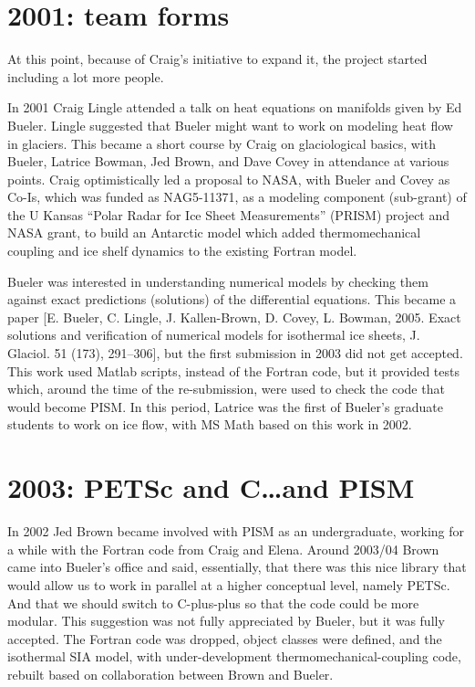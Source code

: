 \documentclass[11pt]{article}
\begin{document}
\section*{2001: team forms}

At this point, because of Craig's initiative to expand it, the project started including a lot more people.

In 2001 Craig Lingle attended a talk on heat equations on manifolds given by Ed Bueler. Lingle suggested that Bueler might want to work on modeling heat flow in glaciers. This became a short course by Craig on glaciological basics, with Bueler, Latrice Bowman, Jed Brown, and Dave Covey in attendance at various points. Craig optimistically led a proposal to NASA, with Bueler and Covey as Co-Is, which was funded as NAG5-11371, as a modeling component (sub-grant) of the U Kansas “Polar Radar for Ice Sheet Measurements” (PRISM) project and NASA grant, to build an Antarctic model which added thermomechanical coupling and ice shelf dynamics to the existing Fortran model.

Bueler was interested in understanding numerical models by checking them against exact predictions (solutions) of the differential equations. This became a paper [E. Bueler, C. Lingle, J. Kallen-Brown, D. Covey, L. Bowman, 2005. Exact solutions and verification of numerical models for isothermal ice sheets, J. Glaciol. 51 (173), 291–306], but the first submission in 2003 did not get accepted. This work used Matlab scripts, instead of the Fortran code, but it provided tests which, around the time of the re-submission, were used to check the code that would become PISM. In this period, Latrice was the first of Bueler's graduate students to work on ice flow, with MS Math based on this work in 2002.

\section*{2003: PETSc and C\ldots{}and PISM}

In 2002 Jed Brown became involved with PISM as an undergraduate, working for a while with the Fortran code from Craig and Elena. Around 2003/04 Brown came into Bueler's office and said, essentially, that there was this nice library that would allow us to work in parallel at a higher conceptual level, namely PETSc. And that we should switch to C-plus-plus so that the code could be more modular. This suggestion was not fully appreciated by Bueler, but it was fully accepted. The Fortran code was dropped, object classes were defined, and the isothermal SIA model, with under-development thermomechanical-coupling code, rebuilt based on collaboration between Brown and Bueler.
\end{document}
